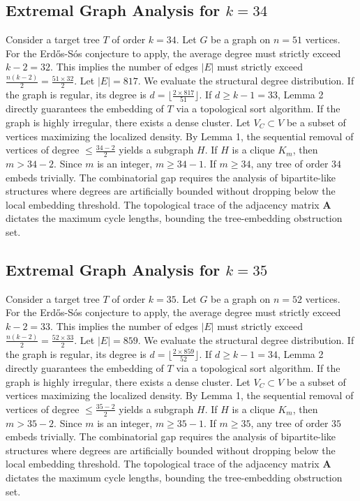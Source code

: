 \documentclass[11pt,a4paper]{article}
\begin{document}
\subsection{Extremal Graph Analysis for $k=34$}
Consider a target tree $T$ of order $k=34$.
Let $G$ be a graph on $n=51$ vertices.
For the Erd\H{o}s-S\'os conjecture to apply, the average degree must strictly exceed $k-2 = 32$.
This implies the number of edges $|E|$ must strictly exceed $\frac{n(k-2)}{2} = \frac{51 \times 32}{2}$.
Let $|E| = 817$.
We evaluate the structural degree distribution. If the graph is regular, its degree is $d = \lfloor \frac{2 \times 817}{51} \rfloor$.
If $d \geq k-1 = 33$, Lemma 2 directly guarantees the embedding of $T$ via a topological sort algorithm.
If the graph is highly irregular, there exists a dense cluster. Let $V_C \subset V$ be a subset of vertices maximizing the localized density.
By Lemma 1, the sequential removal of vertices of degree $\leq \frac{34-2}{2}$ yields a subgraph $H$.
If $H$ is a clique $K_{m}$, then $m > 34-2$. Since $m$ is an integer, $m \geq 34-1$. If $m \geq 34$, any tree of order $34$ embeds trivially.
The combinatorial gap requires the analysis of bipartite-like structures where degrees are artificially bounded without dropping below the local embedding threshold. The topological trace of the adjacency matrix $\mathbf{A}$ dictates the maximum cycle lengths, bounding the tree-embedding obstruction set.


\subsection{Extremal Graph Analysis for $k=35$}
Consider a target tree $T$ of order $k=35$.
Let $G$ be a graph on $n=52$ vertices.
For the Erd\H{o}s-S\'os conjecture to apply, the average degree must strictly exceed $k-2 = 33$.
This implies the number of edges $|E|$ must strictly exceed $\frac{n(k-2)}{2} = \frac{52 \times 33}{2}$.
Let $|E| = 859$.
We evaluate the structural degree distribution. If the graph is regular, its degree is $d = \lfloor \frac{2 \times 859}{52} \rfloor$.
If $d \geq k-1 = 34$, Lemma 2 directly guarantees the embedding of $T$ via a topological sort algorithm.
If the graph is highly irregular, there exists a dense cluster. Let $V_C \subset V$ be a subset of vertices maximizing the localized density.
By Lemma 1, the sequential removal of vertices of degree $\leq \frac{35-2}{2}$ yields a subgraph $H$.
If $H$ is a clique $K_{m}$, then $m > 35-2$. Since $m$ is an integer, $m \geq 35-1$. If $m \geq 35$, any tree of order $35$ embeds trivially.
The combinatorial gap requires the analysis of bipartite-like structures where degrees are artificially bounded without dropping below the local embedding threshold. The topological trace of the adjacency matrix $\mathbf{A}$ dictates the maximum cycle lengths, bounding the tree-embedding obstruction set.
\end{document}
